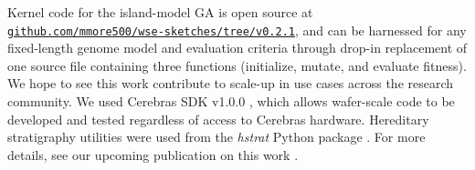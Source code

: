 Kernel code for the island-model GA is open source at\\ \href{https://github.com/mmore500/wse-sketches/tree/v0.2.1}{\texttt{github.com/mmore500/wse-sketches/tree/v0.2.1}}, and can be harnessed for any fixed-length genome model and evaluation criteria through drop-in replacement of one source file containing three functions (initialize, mutate, and evaluate fitness).
We hope to see this work contribute to scale-up in use cases across the research community.
We used Cerebras SDK v1.0.0 \citep{selig2022cerebras}, which allows wafer-scale code to be developed and tested regardless of access to Cerebras hardware.
Hereditary stratigraphy utilities were used from the \textit{hstrat} Python package \citep{moreno2022hstrat}.
For more details, see our upcoming publication on this work \citep{moreno2024trackable}.
